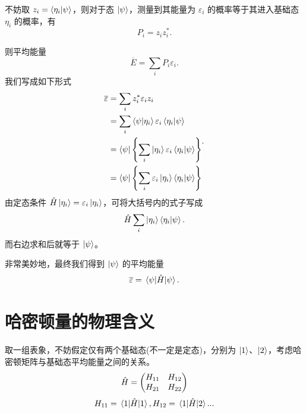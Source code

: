 \documentclass[12pt,a4paper,oneside]{book}
\begin{document}
不妨取 $z_i=\braket{\eta_i}{\psi}$，则对于态 $\ket{\psi}$，测量到其能量为 $\varepsilon_i$ 的概率等于其进入基础态 $\eta_i$ 的概率，有
\begin{equation}
    P_i=z_iz_i^*.
\end{equation}

则平均能量
\begin{equation}
    \overline{E}=\sum_i P_i\varepsilon_i.
\end{equation}
我们写成如下形式
\begin{equation}
    \begin{aligned}
        \overline{\varepsilon}&=\sum_i z_i^*\varepsilon_iz_i\\
        &=\sum_i\braket{\psi}{\eta_i}\varepsilon_i\braket{\eta_i}{\psi}\\
        &=\bra{\psi}\left\{ \sum_i\ket{\eta_i}\varepsilon_i\braket{\eta_i}{\psi} \right\}\\
        &=\bra{\psi}\left\{ \sum_i\varepsilon_i\ket{\eta_i}\braket{\eta_i}{\psi} \right\}
        \end{aligned}.
\end{equation}
由定态条件 $ \hat{H}\ket{\eta_i}=\varepsilon_i\ket{\eta_i} $，可将大括号内的式子写成
\begin{equation}
    \hat{H}\sum_i\ket{\eta_i}\braket{\eta_i}{\psi}.
\end{equation}
而右边求和后就等于 $\ket{\psi}$。

非常美妙地，最终我们得到 $\ket{\psi}$ 的平均能量
\begin{equation}
    \overline{\varepsilon}=\mel{\psi}{\hat{H}}{\psi}.
\end{equation}

\section{哈密顿量的物理含义}

取一组表象，不妨假定仅有两个基础态(不一定是定态)，分别为 $\ket{1}$、$\ket{2}$，考虑哈密顿矩阵与基础态平均能量之间的关系。
\begin{equation}
    \hat{H}=\begin{pmatrix}
        H_{11} & H_{12}\\
        H_{21} & H_{22}
        \end{pmatrix}\\[5mm]
\end{equation}
\begin{equation}
    H_{11}=\mel{1}{\hat{H}}{1},H_{12}=\mel{1}{\hat{H}}{2}...
\end{equation}
\end{document}
